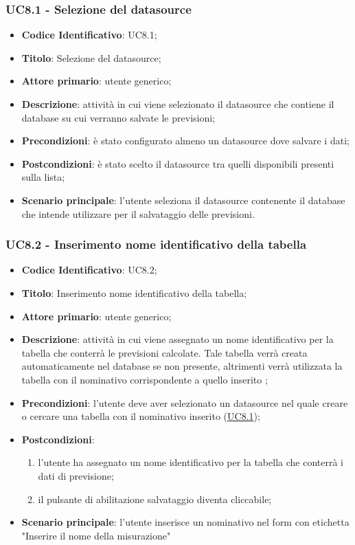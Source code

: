 		\label{par:U8.1}
	\subsubsection{UC8.1 - Selezione del datasource}
		\begin{itemize}
			\item\textbf{Codice Identificativo}: UC8.1;
			\item\textbf{Titolo}: Selezione del datasource;
			\item\textbf{Attore primario}: utente generico;
			\item\textbf{Descrizione}: attività in cui viene selezionato il datasource che contiene il database su cui verranno salvate le previsioni;
			\item\textbf{Precondizioni}: è stato configurato almeno un datasource dove salvare i dati;
			\item\textbf{Postcondizioni}: è stato scelto il datasource tra quelli disponibili presenti sulla lista;
			\item\textbf{Scenario principale}: l'utente seleziona il datasource contenente il database che intende utilizzare per il salvataggio delle previsioni.
		\end{itemize}
		
	\label{par:UC8.2}
	\subsubsection{UC8.2 - Inserimento nome identificativo della tabella}
		\begin{itemize}
			\item\textbf{Codice Identificativo}: UC8.2;
			\item\textbf{Titolo}: Inserimento nome identificativo della tabella;
			\item\textbf{Attore primario}: utente generico;
			\item\textbf{Descrizione}: attività in cui viene assegnato un nome identificativo per la tabella che conterrà le previsioni calcolate. Tale tabella verrà creata automaticamente nel database se non presente, altrimenti verrà utilizzata la tabella con il nominativo corrispondente a quello inserito ;
			\item\textbf{Precondizioni}: l'utente deve aver selezionato un datasource nel quale creare o cercare una tabella con il nominativo inserito (\hyperref[par:UC8.1]{UC8.1});
			\item\textbf{Postcondizioni}:
			\begin{enumerate}
			\item l'utente ha assegnato un nome identificativo per la tabella che conterrà i dati di previsione;
			\item il pulsante di abilitazione salvataggio diventa cliccabile;
 			\end{enumerate}			
		
			\item\textbf{Scenario principale}: l'utente inserisce un nominativo nel form con etichetta "Inserire il nome della misurazione"
		\end{itemize}
		
